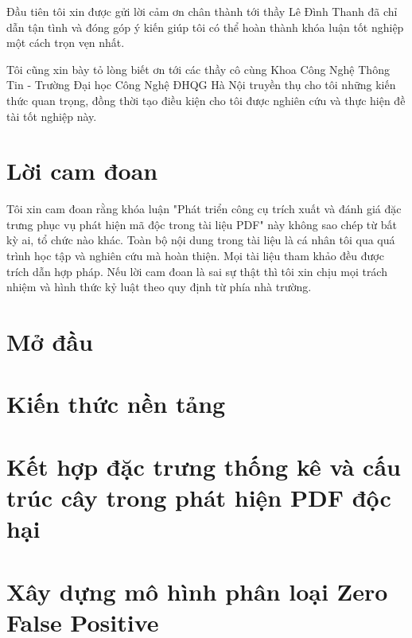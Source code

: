 \documentclass[12pt,a4paper]{report}
\begin{document}
Đầu tiên tôi xin được gửi lời cảm ơn chân thành tới thầy Lê Đình Thanh đã chỉ dẫn tận tình và đóng góp ý kiến giúp tôi có thể hoàn thành khóa luận tốt nghiệp một cách trọn vẹn nhất.

Tôi cũng xin bày tỏ lòng biết ơn tới các thầy cô cùng Khoa Công Nghệ Thông Tin - Trường Đại học Công
Nghệ ĐHQG Hà Nội truyền thụ cho tôi những kiến thức quan trọng, đồng thời tạo điều kiện cho tôi được nghiên cứu và thực hiện đề tài tốt nghiệp này.

\chapter*{Lời cam đoan}

Tôi xin cam đoan rằng khóa luận "Phát triển công cụ trích xuất và đánh giá đặc trưng phục vụ phát hiện mã độc trong tài liệu PDF" này không sao chép từ bất kỳ ai,
tổ chức nào khác. Toàn bộ nội dung trong tài liệu là cá nhân tôi qua quá
trình học tập và nghiên cứu mà hoàn thiện. Mọi tài liệu tham khảo đều được trích dẫn hợp pháp. Nếu lời cam đoan là sai sự thật thì tôi xin chịu mọi trách nhiệm và
hình thức kỷ luật theo quy định từ phía nhà trường.

\tableofcontents{}
\clearpage{}

\listoffigures{}

\listoftables{}

\clearpage

\chapter*{Mở đầu}



\chapter{Kiến thức nền tảng}



\chapter{Kết hợp đặc trưng thống kê và cấu trúc cây trong phát hiện PDF độc hại}



\chapter{Xây dựng mô hình phân loại Zero False Positive}
\end{document}
